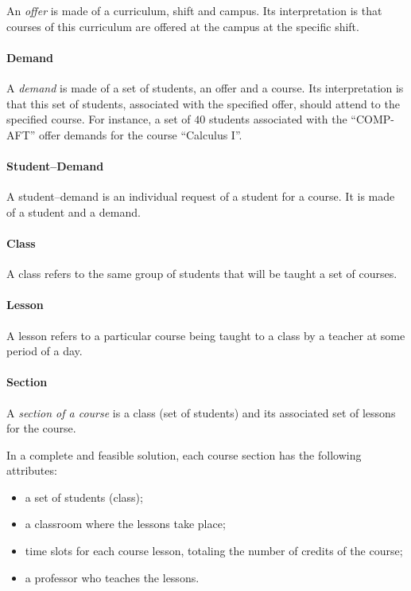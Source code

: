 An \textit{offer} is made of a curriculum, shift and campus. Its interpretation is that courses of this curriculum are offered at the campus at the specific shift.


\paragraph{Demand}
 \label{defdem}

A \textit{demand} is made of a set of students, an offer and a course. Its interpretation is that this set of students, associated with the specified offer, should attend to the specified course.
For instance, a set of $40$ students associated with the ``COMP-AFT'' offer demands for the course ``Calculus I''.


\paragraph{Student--Demand}
\label{defstdem}

A student--demand is an individual request of a student for a course. It is made of a student and a demand.


\paragraph{Class}
\label{defclass}

A class refers to the same group of students that will be taught a set of courses.


\paragraph{Lesson}
\label{deflesson}

A lesson refers to a particular course being taught to a class by a teacher at some period of a day.


\paragraph{Section}
\label{defsection}

A \textit{section of a course} is a class (set of students) and its associated set of lessons for the course.

In a complete and feasible solution, each course section has the following attributes:
\begin{itemize}
\item a set of students (class);
\item a classroom where the lessons take place;
\item time slots for each course lesson, totaling the number of credits of the course;
\item a professor who teaches the lessons.
\end{itemize}


